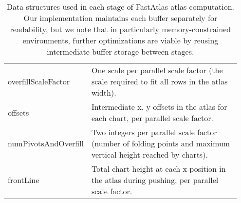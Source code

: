 \begin{table}[]
\begin{tabular}{p{0.3\linewidth} | p{0.65\linewidth}}
overfillScaleFactor              & One scale per parallel scale factor (the scale required to fit all rows in the atlas width). \\
offsets                          & Intermediate x, y offsets in the atlas for each chart, per parallel scale factor. \\
numPivotsAndOverfill             & Two integers per parallel scale factor (number of folding points and maximum vertical height reached by charts). \\
frontLine                        & Total chart height at each x-position in the atlas during pushing, per parallel scale factor.
\end{tabular}

\vspace{1mm}
\caption{Data structures used in each stage of FastAtlas atlas computation. Our implementation maintains each buffer separately for readability, but we note that in particularly memory-constrained environments, further optimizations are viable by reusing intermediate buffer storage between stages.}
\label{tab:data_structures}
\end{table}
